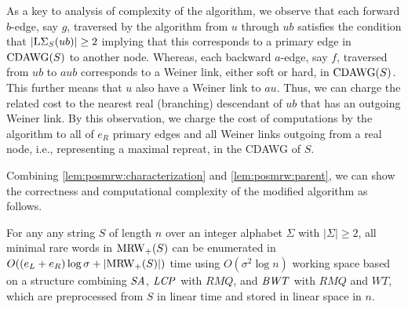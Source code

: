 As a key to analysis of complexity of the algorithm, we observe that each forward $b$-edge, say $g$, traversed by the algorithm from $u$ through $ub$ satisfies the condition that $|\LSigma[S](ub)| \ge 2$ implying that this corresponds to a primary edge in $\CDAWG(S)$ to another node. Whereas, each backward $a$-edge, say $f$, traversed from $ub$ to $aub$ corresponds to a Weiner link, either soft or hard, in $\CDAWG(S)$. This further means that $u$ also have a Weiner link to $au$. Thus, we can charge the related cost to the nearest real (branching) descendant of $ub$ that has an outgoing Weiner link.
By this observation, we charge the cost of computations by the algorithm to all of $e_R$ primary edges and all Weiner links outgoing from a real node, i.e., representing a maximal repreat, in the CDAWG of $S$. 


  Combining \cref{lem:posmrw:characterization} and  \cref{lem:posmrw:parent}, we can show the correctness and computational complexity of the modified algorithm as follows. 

\begin{theorem}\label{thm:algo:mrw}
  For any any string $S$ of length $n$ over an integer alphabet $\Sigma$ with $|\Sigma| \ge 2$, all minimal rare words in $\MRW_+(S)$ can be enumerated
  in $O((e_L + e_R)\log\sigma + |\MRW_+(S)|)$ time using
  $O(\sigma^2\log n)$ working space
  based on a structure combining $\SA$, $\LCP$ with $RMQ$, and $\BWT$ with $RMQ$  and $WT$,  which are preprocessed from $S$ in linear time and stored in linear space in $n$. 
\end{theorem}

